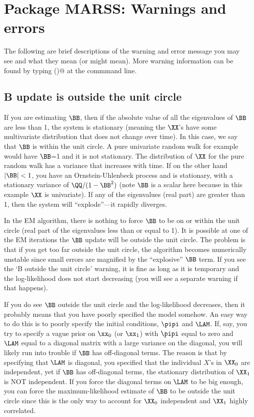 \chapter{Package MARSS:  Warnings and errors}
\label{app:warnings}
The following are brief descriptions of the warning and error message you may see and what they mean (or might mean).  More warning information can be found by typing \verb@MARSSinfo()@ at the commmand line.

\section*{B update is outside the unit circle}
If you are estimating $\BB$, then if the absolute value of all the eigenvalues of $\BB$ are less than 1, the system is stationary (meaning the $\XX$'s have some multivariate distribution that does not change over time).  In this case, we say that $\BB$ is within the unit circle.  A pure univariate random walk for example would have $\BB$=1 and it is not stationary.  The distribution of $\XX$ for the pure random walk has a variance that increases with time.  If on the other hand $|\BB|<1$, you have an Ornstein-Uhlenbeck process and is stationary, with a stationary variance of $\QQ/(1-\BB^2)$ (note $\BB$ is a scalar here because in this example $\XX$ is univariate).  If any of the eigenvalues (real part) are greater than 1, then the system will ``explode''---it rapidly diverges.

In the EM algorithm, there is nothing to force $\BB$ to be on or within the unit circle (real part of the eigenvalues less than or equal to 1).  It is possible at one of the EM iterations the $\BB$ update will be outside the unit circle.  The problem is that if you get too far outside the unit circle, the algorithm becomes numerically unstable since small errors are magnified by the ``explosive'' $\BB$ term.  If you see the `B outside the unit circle' warning, it is fine as long as it is temporary and the log-likelihood does not start decreasing (you will see a separate warning if that happens).

If you do see $\BB$ outside the unit circle and the log-likelihood decreases, then it probably means that you have poorly specified the model somehow.  An easy way to do this is to poorly specify the initial conditions, $\pipi$ and $\LAM$.  If, say, you try to specify a vague prior on $\xx_0$ (or $\xx_1$) with $\pipi$ equal to zero and $\LAM$ equal to a diagonal matrix with a large variance on the diagonal, you will likely run into trouble if $\BB$ has off-diagonal terms.  The reason is that by specifying that $\LAM$ is diagonal, you specified that the individual $X$'s in $\XX_0$ are independent, yet if $\BB$ has off-diagonal terms, the stationary distribution of $\XX_1$ is NOT independent.  If you force the diagonal terms on $\LAM$ to be big enough, you can force the maximum-likelihood estimate of $\BB$ to be outside the unit circle since this is the only way to account for $\XX_0$ independent and $\XX_1$ highly correlated.  

